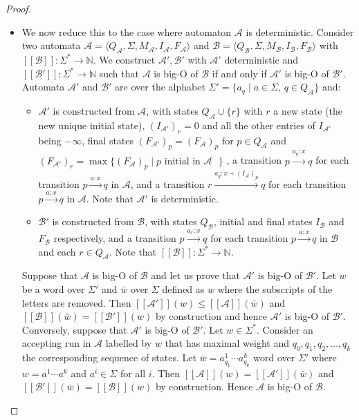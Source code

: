\documentclass[10pt,a4paper]{amsart}
\theoremstyle{definition}
\numberwithin{equation}{section}
\theoremstyle{remark}
\newcommand{\N}{\mathbb{N}}
\newcommand{\autA}{\mathcal{A}}
\newcommand{\autB}{\mathcal{B}}
\newcommand{\brfunc}[1]{[\![#1]\!]}
\newcommand{\funcA}{\brfunc{\autA}}
\newcommand{\funcB}{\brfunc{\autB}}
\theoremstyle{remark}
\begin{document}
\begin{proof}
\begin{itemize}
\item We now reduce this to the case where automaton $\autA$ is deterministic. Consider two automata $\autA = \langle Q_\autA, \Sigma, M_\autA, I_\autA, F_\autA\rangle$ and $\autB = \langle Q_\autB, \Sigma, M_\autB, I_\autB, F_\autB\rangle$ with $\brfunc{\autB}:\Sigma^* \to \N$. We construct $\autA',\autB'$ with $\autA'$ deterministic and $\brfunc{\autB'}:\Sigma^* \to \N$ such that $\autA$ is big-O of $\autB$ if and only if $\autA'$ is big-O of $\autB'$. Automata  $\autA'$ and $\autB'$ are over the alphabet $\Sigma' = \{a_q \mid a \in \Sigma\text{, } q \in Q_\autA \}$ and: 
\begin{itemize}
\item $\autA'$ is constructed from $\autA$, with states $Q_\autA \cup \{r\}$ with $r$ a new state (the new unique initial state), $(I_{\autA'})_r = 0$ and all the other entries of $I_{\autA'}$ being $-\infty$, final states $(F_{\autA'})_p = (F_{\autA})_p$ for $p\in Q_\autA$ and $(F_{\autA'})_r = \max\{(F_\autA)_p \mid p \text{ initial in $\autA$ }\}$ , a transition $p\xrightarrow{a_q:x}q$ for each transition $p\xrightarrow{a:x}q$ in $\autA$, and a transition $r\xrightarrow{a_q: x+(I_\autA)_p}q$ for each transition $p\xrightarrow{a:x}q$ in $\autA$. Note that $\autA'$ is deterministic.
\item  $\autB'$ is constructed from $\autB$, with states $Q_\autB$, initial and final states $I_\autB$ and $F_\autB$ respectively, and a transition $p\xrightarrow{a_r:x}q$ for each transition $p\xrightarrow{a:x}q$ in $\autB$ and each $r \in Q_\autA$. Note that $\brfunc{\autB}:\Sigma^* \to \N$.
\end{itemize}
Suppose that $\autA$ is big-O of $\autB$ and let us prove that $\autA'$ is big-O of $\autB'$. Let $w$ be a word over $\Sigma'$ and $\bar{w}$ over $\Sigma$ defined as $w$ where the subscripts of the letters are removed. Then $\brfunc{\autA'}(w) \leq \funcA(\bar{w})$ and $\funcB(\bar{w}) = \brfunc{\autB'}(w)$ by construction and hence $\autA'$ is big-O of $\autB'$. Conversely, suppose that $\autA'$ is big-O of $\autB'$. Let $w \in \Sigma^*$. Consider an accepting run in $\autA$ labelled by $w$ that has maximal weight and $q_0, q_1, q_2, \ldots, q_k$ the corresponding sequence of states. Let $\bar{w} = a^1_{q_1} \dotsm a^k_{q_k}$ word over $\Sigma'$ where $w = a^1 \dotsm a^k$ and $a^i \in \Sigma$ for all $i$. Then $\funcA(w) = \brfunc{\autA'}(\bar{w})$ and $\brfunc{\autB'}(\bar{w}) = \funcB(w)$ by construction. Hence $\autA$ is big-O of $\autB$.\qedhere
\end{itemize}
\end{proof}
\end{document}
